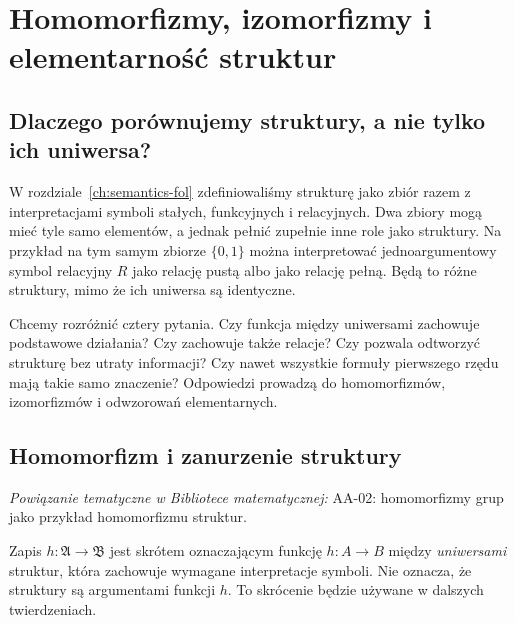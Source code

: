 \chapter[Izomorfizmy i elementarność struktur]{Homomorfizmy, izomorfizmy i elementarność struktur}
\label{ch:model-morphisms}

\providecommand{\atlasref}[2]{#2}


\section{Dlaczego porównujemy struktury, a nie tylko ich uniwersa?}
W rozdziale~\ref{ch:semantics-fol} zdefiniowaliśmy strukturę jako zbiór
razem z interpretacjami symboli stałych, funkcyjnych i relacyjnych.
Dwa zbiory mogą mieć tyle samo elementów, a jednak pełnić zupełnie inne
role jako struktury. Na przykład na tym samym zbiorze $\{0,1\}$
można interpretować jednoargumentowy symbol relacyjny $R$
jako relację pustą albo jako relację pełną. Będą to różne struktury, mimo że ich uniwersa są identyczne.

Chcemy rozróżnić cztery pytania. Czy funkcja między uniwersami
zachowuje podstawowe działania? Czy zachowuje także relacje?
Czy pozwala odtworzyć strukturę bez utraty informacji?
Czy nawet wszystkie formuły pierwszego rzędu mają takie samo znaczenie?
Odpowiedzi prowadzą do homomorfizmów, izomorfizmów i odwzorowań elementarnych.

\section{Homomorfizm i zanurzenie struktury}

\noindent\emph{Powiązanie tematyczne w Bibliotece matematycznej:} \atlasref{AA-02::aa:def:hom}{AA-02: homomorfizmy grup jako przykład homomorfizmu struktur}.

\begin{uwaga}
Zapis $h:\mathfrak A\to\mathfrak B$ jest skrótem oznaczającym
funkcję $h:A\to B$ między \emph{uniwersami} struktur, która zachowuje
wymagane interpretacje symboli. Nie oznacza, że struktury są argumentami
funkcji $h$. To skrócenie będzie używane w dalszych twierdzeniach.
\end{uwaga}

